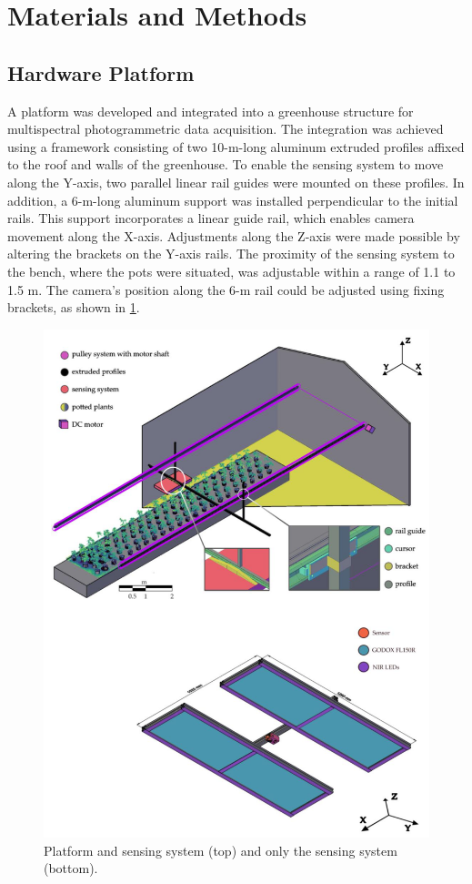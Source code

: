 \documentclass[12pt,a4paper,oneside]{report}
\begin{document}
\section{Materials and Methods}
\subsection{Hardware Platform}

A platform was developed and integrated into a greenhouse structure for multispectral photogrammetric data acquisition. The integration was achieved using a framework consisting of two 10-m-long aluminum extruded profiles affixed to the roof and walls of the greenhouse. To enable the sensing system to move along the Y-axis, two parallel linear rail guides were mounted on these profiles. In addition, a 6-m-long aluminum support was installed perpendicular to the initial rails. This support incorporates a linear guide rail, which enables camera movement along the X-axis. Adjustments along the Z-axis were made possible by altering the brackets on the Y-axis rails. The proximity of the sensing system to the bench, where the pots were situated, was adjustable within a range of 1.1 to 1.5 m. The camera’s position along the 6-m rail could be adjusted using fixing brackets, 
as shown in \cref{fig:camera_position}.

\begin{figure}[H]
    \centering
    \includegraphics[width=\textwidth]{Images/agronomy-14-00306-g001}
    \caption{Platform and sensing system (top) and only the sensing system (bottom).}
    \label{fig:camera_position}
\end{figure}
\end{document}
